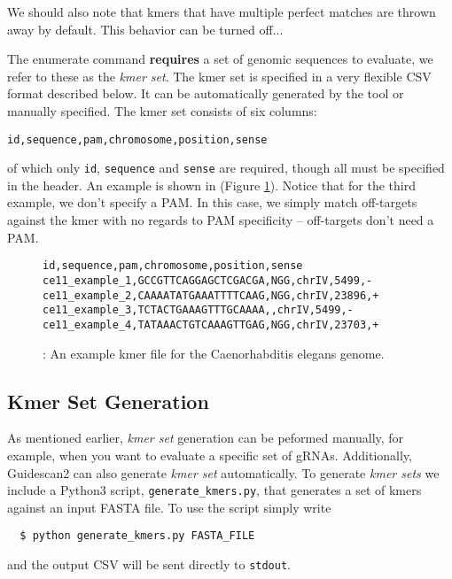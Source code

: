 \documentclass[11pt]{article}
\begin{document}
We should also note that kmers that have multiple perfect matches are
thrown away by default. This behavior can be turned off...

The enumerate command {\bf requires} a set of genomic sequences to
evaluate, we refer to these as the {\it kmer set}. The kmer set is
specified in a very flexible CSV format described below. It can be
automatically generated by the tool or manually specified. The kmer
set consists of six columns:

\begin{center}
  \texttt{id,sequence,pam,chromosome,position,sense} 
\end{center}

of which only \texttt{id}, \texttt{sequence} and \texttt{sense} are
required, though all must be specified in the header. An example is
shown in (Figure \ref{fig:kmer_set}). Notice that for the third
example, we don't specify a PAM. In this case, we simply match
off-targets against the kmer with no regards to PAM specificity --
off-targets don't need a PAM.

\begin{figure}[ht]
  \centering
  \begin{verbatim}
id,sequence,pam,chromosome,position,sense
ce11_example_1,GCCGTTCAGGAGCTCGACGA,NGG,chrIV,5499,-
ce11_example_2,CAAAATATGAAATTTTCAAG,NGG,chrIV,23896,+
ce11_example_3,TCTACTGAAAGTTTGCAAAA,,chrIV,5499,-
ce11_example_4,TATAAACTGTCAAAGTTGAG,NGG,chrIV,23703,+
  \end{verbatim}
  \caption{\label{fig:kmer_set}: An example kmer file for the
    Caenorhabditis elegans genome.}
\end{figure}

\subsection{Kmer Set Generation}
As mentioned earlier, {\it kmer set} generation can be peformed manually,
for example, when you want to evaluate a specific set of gRNAs.
Additionally, Guidescan2 can also generate {\it kmer set} automatically.
To generate {\it kmer sets} we include a Python3 script,
\texttt{generate\_kmers.py}, that generates a set of kmers against an
input FASTA file. To use the script simply write
\begin{verbatim}
  $ python generate_kmers.py FASTA_FILE 
\end{verbatim}
and the output CSV will be sent directly to \texttt{stdout}.
\end{document}
